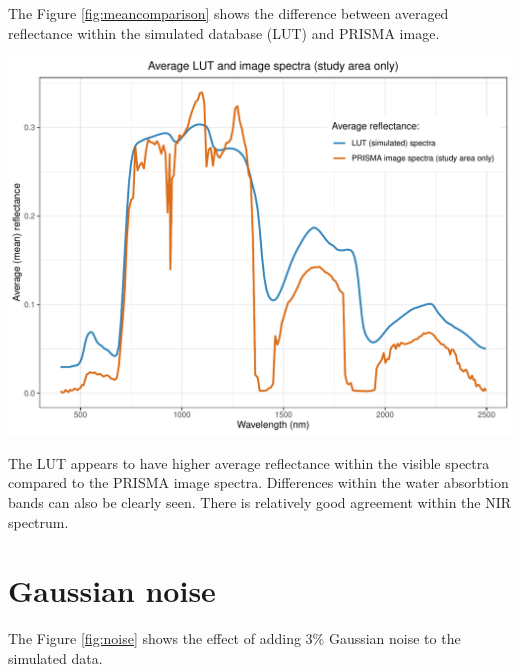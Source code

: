 \documentclass[a4paper, twoside]{templates/ociamthesis}
\let\origfigure\figure
\let\endorigfigure\endfigure
\renewenvironment{figure}[1][2] {
    \expandafter\origfigure\expandafter[H]
} {
    \endorigfigure
}
\begin{document}
The Figure \ref{fig:meancomparison} shows the difference between averaged reflectance within the simulated database (LUT) and PRISMA image.

\begin{figure}

{\centering \includegraphics[width=0.8\linewidth]{./figures/meancomparison_lut_vs_prisma} 

}

\caption{Difference between averaged LUT and PRISMA image reflectance}\label{fig:meancomparison}
\end{figure}

The LUT appears to have higher average reflectance within the visible spectra compared to the PRISMA image spectra. Differences within the water absorbtion bands can also be clearly seen. There is relatively good agreement within the NIR spectrum.

\newpage

\hypertarget{gaussian-noise-1}{%
\section{Gaussian noise}\label{gaussian-noise-1}}

The Figure \ref{fig:noise} shows the effect of adding 3\% Gaussian noise to the simulated data.
\end{document}
